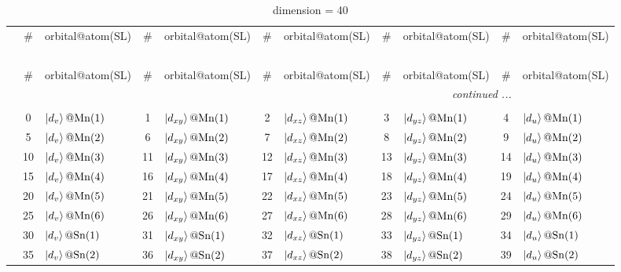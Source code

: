 \documentclass[fleqn,10pt,landscape]{jsarticle}
\begin{document}
\renewcommand{\arraystretch}{1.6}
\begin{longtable}[l]{c|cl|cl|cl|cl|cl}
\captionsetup{justification=raggedright, singlelinecheck=off}
\caption{dimension = 40}
 \\
 \hline \hline
 & \# & orbital@atom(SL) & \# & orbital@atom(SL) & \# & orbital@atom(SL) & \# & orbital@atom(SL) & \# & orbital@atom(SL) \\ \hline \endfirsthead

\multicolumn{10}{l}{\tablename\ \thetable{}} \\
 \hline \hline
 & \# & orbital@atom(SL) & \# & orbital@atom(SL) & \# & orbital@atom(SL) & \# & orbital@atom(SL) & \# & orbital@atom(SL) \\ \hline \endhead

 \hline \hline
\multicolumn{10}{r}{\footnotesize\it continued ...} \\ \endfoot

 \hline \hline
\multicolumn{10}{r}{} \\ \endlastfoot

 & 0 & $\ket{d_{v}}@{\rm Mn}(1)$ & 1 & $\ket{d_{xy}}@{\rm Mn}(1)$ & 2 & $\ket{d_{xz}}@{\rm Mn}(1)$ & 3 & $\ket{d_{yz}}@{\rm Mn}(1)$ & 4 & $\ket{d_{u}}@{\rm Mn}(1)$ \\
& 5 & $\ket{d_{v}}@{\rm Mn}(2)$ & 6 & $\ket{d_{xy}}@{\rm Mn}(2)$ & 7 & $\ket{d_{xz}}@{\rm Mn}(2)$ & 8 & $\ket{d_{yz}}@{\rm Mn}(2)$ & 9 & $\ket{d_{u}}@{\rm Mn}(2)$ \\
& 10 & $\ket{d_{v}}@{\rm Mn}(3)$ & 11 & $\ket{d_{xy}}@{\rm Mn}(3)$ & 12 & $\ket{d_{xz}}@{\rm Mn}(3)$ & 13 & $\ket{d_{yz}}@{\rm Mn}(3)$ & 14 & $\ket{d_{u}}@{\rm Mn}(3)$ \\
& 15 & $\ket{d_{v}}@{\rm Mn}(4)$ & 16 & $\ket{d_{xy}}@{\rm Mn}(4)$ & 17 & $\ket{d_{xz}}@{\rm Mn}(4)$ & 18 & $\ket{d_{yz}}@{\rm Mn}(4)$ & 19 & $\ket{d_{u}}@{\rm Mn}(4)$ \\
& 20 & $\ket{d_{v}}@{\rm Mn}(5)$ & 21 & $\ket{d_{xy}}@{\rm Mn}(5)$ & 22 & $\ket{d_{xz}}@{\rm Mn}(5)$ & 23 & $\ket{d_{yz}}@{\rm Mn}(5)$ & 24 & $\ket{d_{u}}@{\rm Mn}(5)$ \\
& 25 & $\ket{d_{v}}@{\rm Mn}(6)$ & 26 & $\ket{d_{xy}}@{\rm Mn}(6)$ & 27 & $\ket{d_{xz}}@{\rm Mn}(6)$ & 28 & $\ket{d_{yz}}@{\rm Mn}(6)$ & 29 & $\ket{d_{u}}@{\rm Mn}(6)$ \\
& 30 & $\ket{d_{v}}@{\rm Sn}(1)$ & 31 & $\ket{d_{xy}}@{\rm Sn}(1)$ & 32 & $\ket{d_{xz}}@{\rm Sn}(1)$ & 33 & $\ket{d_{yz}}@{\rm Sn}(1)$ & 34 & $\ket{d_{u}}@{\rm Sn}(1)$ \\
& 35 & $\ket{d_{v}}@{\rm Sn}(2)$ & 36 & $\ket{d_{xy}}@{\rm Sn}(2)$ & 37 & $\ket{d_{xz}}@{\rm Sn}(2)$ & 38 & $\ket{d_{yz}}@{\rm Sn}(2)$ & 39 & $\ket{d_{u}}@{\rm Sn}(2)$ \\
\end{longtable}
\end{document}
